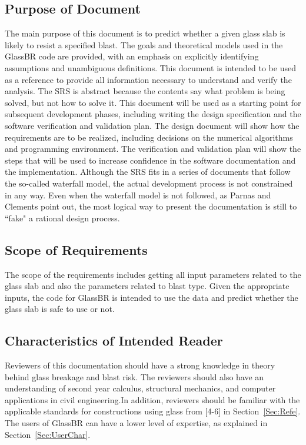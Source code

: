 \documentclass[12pt]{article}
\begin{document}
\subsection{Purpose of Document}
\label{Sec:PurpofDocu}
The main purpose of this document is to predict whether a given glass slab is likely to resist a specified blast. The goals and theoretical models used in the GlassBR code are provided, with an emphasis on explicitly identifying assumptions and unambiguous definitions. This document is intended to be used as a reference to provide all information necessary to understand and verify the analysis. The SRS is abstract because the contents say what problem is being solved, but not how to solve it.
This document will be used as a starting point for subsequent development phases, including writing the design specification and the software verification and validation plan. The design document will show how the requirements are to be realized, including decisions on the numerical algorithms and programming environment. The verification and validation plan will show the steps that will be used to increase confidence in the software documentation and the implementation. Although the SRS fits in a series of documents that follow the so-called waterfall model, the actual development process is not constrained in any way. Even when the waterfall model is not followed, as Parnas and Clements point out, the most logical way to present the documentation is still to ``fake" a rational design process.
\subsection{Scope of Requirements}
\label{Sec:ScopofRequ}
The scope of the requirements includes getting all input parameters related to the glass slab and also the parameters related to blast type. Given the appropriate inputs, the code for GlassBR is intended to use the data and predict whether the glass slab is safe to use or not.
\subsection{Characteristics of Intended Reader}
\label{Sec:CharofInteRead}
Reviewers of this documentation should have a strong knowledge in theory behind glass breakage and blast risk. The reviewers should also have an understanding of second year calculus, structural mechanics, and computer applications in civil engineering.In addition, reviewers should be familiar with the applicable standards for constructions using glass from [4-6] in Section~\ref{Sec:Refe}. The users of GlassBR can have a lower level of expertise, as explained in Section~\ref{Sec:UserChar}.
\end{document}
